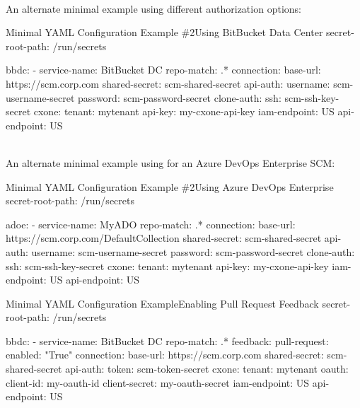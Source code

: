 \pagebreak
\noindent\\An alternate minimal example using different authorization options:

\begin{code}{Minimal YAML Configuration Example \#2}{Using BitBucket Data Center}{}
secret-root-path: /run/secrets

bbdc:
    - service-name: BitBucket DC
      repo-match: .*
      connection:
      base-url: https://scm.corp.com
      shared-secret: scm-shared-secret
      api-auth:
          username: scm-username-secret
          password: scm-password-secret
      clone-auth:
          ssh: scm-ssh-key-secret
      cxone:
        tenant: mytenant
        api-key: my-cxone-api-key
        iam-endpoint: US
        api-endpoint: US
\end{code}
    
\pagebreak
\noindent\\An alternate minimal example using for an Azure DevOps Enterprise
SCM:

\begin{code}{Minimal YAML Configuration Example \#2}{Using Azure DevOps Enterprise}{}
secret-root-path: /run/secrets

adoe:
    - service-name: MyADO
      repo-match: .*
      connection:
      base-url: https://scm.corp.com/DefaultCollection
      shared-secret: scm-shared-secret
      api-auth:
          username: scm-username-secret
          password: scm-password-secret
      clone-auth:
          ssh: scm-ssh-key-secret
      cxone:
        tenant: mytenant
        api-key: my-cxone-api-key
        iam-endpoint: US
        api-endpoint: US
\end{code}


\begin{code}{Minimal YAML Configuration Example}{Enabling Pull Request Feedback}{}
    secret-root-path: /run/secrets
    
    bbdc:
        - service-name: BitBucket DC
          repo-match: .*
          feedback:
            pull-request:
              enabled: "True"
          connection:
            base-url: https://scm.corp.com
            shared-secret: scm-shared-secret
            api-auth:
                token: scm-token-secret
          cxone:
            tenant: mytenant
            oauth:
                client-id: my-oauth-id
                client-secret: my-oauth-secret
            iam-endpoint: US
            api-endpoint: US
    \end{code}
    